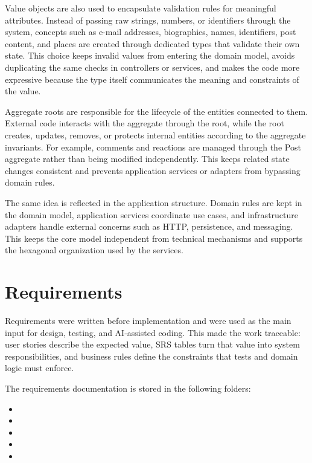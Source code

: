 \documentclass[12pt,a4paper]{article}
\begin{document}
Value objects are also used to encapsulate validation rules for meaningful attributes. Instead of passing raw strings, numbers, or identifiers through the system, concepts such as e-mail addresses, biographies, names, identifiers, post content, and places are created through dedicated types that validate their own state. This choice keeps invalid values from entering the domain model, avoids duplicating the same checks in controllers or services, and makes the code more expressive because the type itself communicates the meaning and constraints of the value.

Aggregate roots are responsible for the lifecycle of the entities connected to them. External code interacts with the aggregate through the root, while the root creates, updates, removes, or protects internal entities according to the aggregate invariants. For example, comments and reactions are managed through the Post aggregate rather than being modified independently. This keeps related state changes consistent and prevents application services or adapters from bypassing domain rules.

The same idea is reflected in the application structure. Domain rules are kept in the domain model, application services coordinate use cases, and infrastructure adapters handle external concerns such as HTTP, persistence, and messaging. This keeps the core model independent from technical mechanisms and supports the hexagonal organization used by the services.

\section{Requirements}

Requirements were written before implementation and were used as the main input for design, testing, and AI-assisted coding. This made the work traceable: user stories describe the expected value, SRS tables turn that value into system responsibilities, and business rules define the constraints that tests and domain logic must enforce.

The requirements documentation is stored in the following folders:

\begin{itemize}
    \item {}
    \item {}
    \item {}
    \item {}
    \item {}
\end{itemize}
\end{document}
